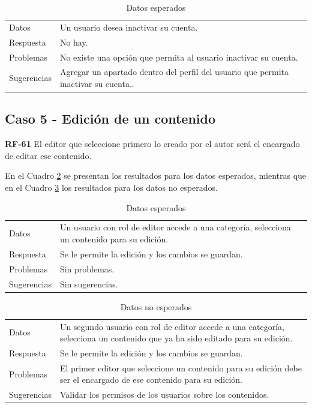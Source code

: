 \documentclass[10pt,times,twocolumn]{article}
\begin{document}
\begin{table}[H]
    \centering
    \begin{tabular}{p{3cm}p{4cm}}
        \rowcolor{gray!15}
        Datos & Un usuario desea inactivar su cuenta.\\
       	Respuesta & No hay.\\
       	Problemas & No existe una opción que permita al usuario inactivar su cuenta.\\
       	Sugerencias & Agregar un apartado dentro del perfil del usuario que permita inactivar su cuenta..\\
    \end{tabular}
    \caption{Datos esperados}
    \label{tab:caso4_esperado}
\end{table}

\subsection{Caso 5 - Edición de un contenido}

\textbf{RF-61} El editor que seleccione primero lo creado por el autor será el encargado de editar ese contenido. 

En el Cuadro \ref{tab:caso5_esperado} se presentan los resultados para los datos esperados, mientras que en el Cuadro \ref{tab:caso5_no_esperado} los resultados para los datos no esperados.

\begin{table}[H]
    \centering
    \begin{tabular}{p{3cm}p{4cm}}
        \rowcolor{gray!15}
        Datos & Un usuario con rol de editor accede a una categoría, selecciona un contenido para su edición.\\
       	Respuesta & Se le permite la edición y los cambios se guardan.\\
       	Problemas & Sin problemas.\\
       	Sugerencias & Sin sugerencias.\\
    \end{tabular}
    \caption{Datos esperados}
    \label{tab:caso5_esperado}
\end{table}

\begin{table}[H]
    \centering
    \begin{tabular}{p{3cm}p{4cm}}
        \rowcolor{gray!15}
        Datos & Un segundo usuario con rol de editor accede a una categoría, selecciona un contenido que ya ha sido editado para su edición.\\
        Respuesta & Se le permite la edición y los cambios se guardan.\\
       	Problemas & El primer editor que seleccione un contenido para su edición debe ser el encargado de ese contenido para su edición.\\
       	Sugerencias & Validar los permisos de los usuarios sobre los contenidos.\\
    \end{tabular}
    \caption{Datos no esperados}
    \label{tab:caso5_no_esperado}
\end{table}
\end{document}
